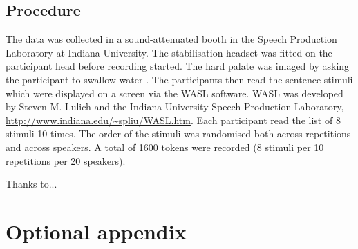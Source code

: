 \documentclass[preprint]{JASAnew}
\begin{document}
\subsection{Procedure}\label{procedure}

The data was collected in a sound-attenuated booth in the Speech
Production Laboratory at Indiana University. The stabilisation headset
was fitted on the participant head before recording started. The hard
palate was imaged by asking the participant to swallow water
\citep{epstein2005}. The participants then read the sentence stimuli
which were displayed on a screen via the WASL software. WASL was
developed by Steven M. Lulich and the Indiana University Speech
Production Laboratory, \url{http://www.indiana.edu/~spliu/WASL.htm}.
Each participant read the list of 8 stimuli 10 times. The order of the
stimuli was randomised both across repetitions and across speakers. A
total of 1600 tokens were recorded (8 stimuli per 10 repetitions per 20
speakers).

\begin{acknowledgments}
Thanks to...
\end{acknowledgments}

\appendix
\section{Optional appendix}










\end{document}
